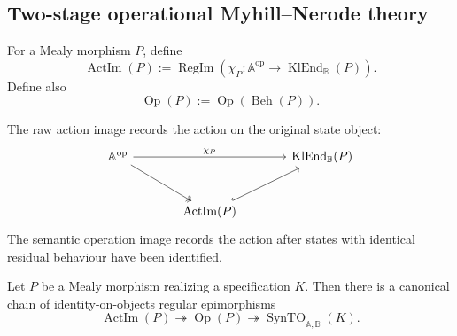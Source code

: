 \subsection{Two-stage operational Myhill--Nerode theory}
\label{subsec:to-two-stage-operational-myhill-nerode}

\begin{definition}
\label{def:to-raw-action-image}
    For a Mealy morphism \(P\), define
    \[
        \operatorname{ActIm}(P)
        :=
        \operatorname{RegIm}
        \left(
            \chi_P:
            \mathbb A^{\mathrm{op}}
            \to
            \operatorname{KlEnd}_{\mathbb B}(P)
        \right).
    \]
    Define also
    \[
        \operatorname{Op}(P)
        :=
        \operatorname{Op}(\operatorname{Beh}(P)).
    \]
\end{definition}

The raw action image records the action on the original state object:
\[
\begin{tikzcd}[column sep=large, row sep=large]
    \mathbb A^{\mathrm{op}}
        \arrow[rr, "\chi_P"]
        \arrow[dr, two heads]
    &&
    \operatorname{KlEnd}_{\mathbb B}(P)
    \\
    &
    \operatorname{ActIm}(P)
        \arrow[ur, hook]
    &
\end{tikzcd}
\]
The semantic operation image records the action after states with identical
residual behaviour have been identified.

\begin{theorem}
\label{thm:to-two-stage-operational-quotient}
    Let \(P\) be a Mealy morphism realizing a specification \(K\). Then there
    is a canonical chain of identity-on-objects regular epimorphisms
    \[
        \operatorname{ActIm}(P)
        \twoheadrightarrow
        \operatorname{Op}(P)
        \twoheadrightarrow
        \operatorname{SynTO}_{\mathbb A,\mathbb B}(K).
    \]
\end{theorem}

